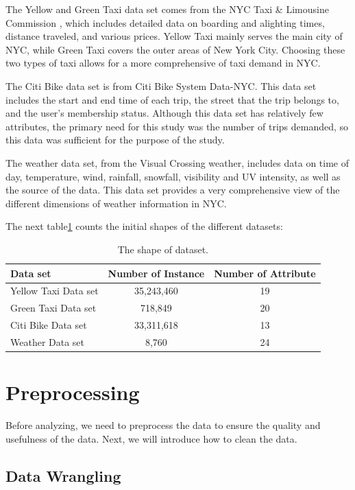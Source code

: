 \documentclass[11pt]{article}
\begin{document}
The Yellow and Green Taxi data set comes from the NYC Taxi \& Limousine Commission \cite{tlc}, which includes detailed data on boarding and alighting times, distance traveled, and various prices. Yellow Taxi mainly serves the main city of NYC, while Green Taxi covers the outer areas of New York City. Choosing these two types of taxi allows for a more comprehensive of taxi demand in NYC.

The Citi Bike data set is from Citi Bike System Data-NYC\cite{citibike}. This data set includes the start and end time of each trip, the street that the trip belongs to, and the user's membership status. Although this data set has relatively few attributes, the primary need for this study was the number of trips demanded, so this data was sufficient for the purpose of the study.

The weather data set, from the Visual Crossing weather\cite{visualcrossing}, includes data on time of day, temperature, wind, rainfall, snowfall, visibility and UV intensity, as well as the source of the data. This data set provides a very comprehensive view of the different dimensions of weather information in NYC.

The next table\ref{tab:dataset_summary} counts the initial shapes of the different datasets:
\begin{table}[h!]
\centering
\begin{tabular}{|l|c|c|}
\hline
\textbf{Data set} & \textbf{Number of Instance} & \textbf{Number of Attribute} \\ \hline
Yellow Taxi Data set & 35,243,460 & 19 \\ \hline
Green Taxi Data set & 718,849 & 20 \\ \hline
Citi Bike Data set & 33,311,618 & 13 \\ \hline
Weather Data set & 8,760 & 24 \\ \hline
\end{tabular}
\caption{The shape of dataset.}
\label{tab:dataset_summary}
\end{table}
\section{Preprocessing}
Before analyzing, we need to preprocess the data to ensure the quality and usefulness of the data. Next, we will introduce how to clean the data.
\subsection{Data Wrangling}
\end{document}
